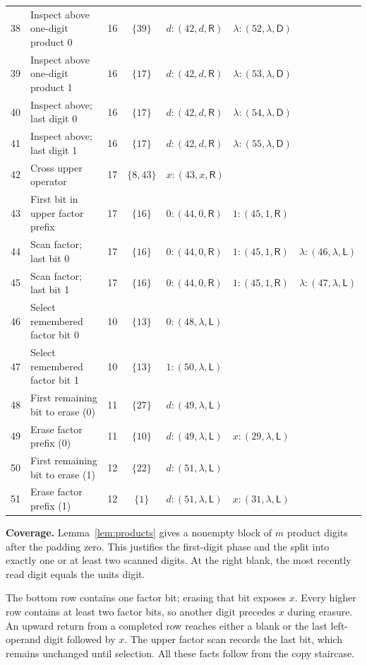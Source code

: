 \documentclass[11pt,a4paper]{article}
\newcommand{\blank}{\lambda}
\newcommand{\triple}[3]{(#1,#2,\mathsf{#3})}
\begin{document}
\begin{center}
\begin{tabularx}{\textwidth}{r p{5.5cm} c c X}
38 & Inspect above one-digit product 0 & 16 & $\{39\}$ & $d:\triple{42}{d}{R}\quad \blank:\triple{52}{\blank}{D}$ \\
39 & Inspect above one-digit product 1 & 16 & $\{17\}$ & $d:\triple{42}{d}{R}\quad \blank:\triple{53}{\blank}{D}$ \\
40 & Inspect above; last digit 0 & 16 & $\{17\}$ & $d:\triple{42}{d}{R}\quad \blank:\triple{54}{\blank}{D}$ \\
41 & Inspect above; last digit 1 & 16 & $\{17\}$ & $d:\triple{42}{d}{R}\quad \blank:\triple{55}{\blank}{D}$ \\
42 & Cross upper operator & 17 & $\{8,43\}$ & $x:\triple{43}{x}{R}$ \\
43 & First bit in upper factor prefix & 17 & $\{16\}$ & $0:\triple{44}{0}{R}\quad 1:\triple{45}{1}{R}$ \\
44 & Scan factor; last bit 0 & 17 & $\{16\}$ & $0:\triple{44}{0}{R}\quad 1:\triple{45}{1}{R}\quad \blank:\triple{46}{\blank}{L}$ \\
45 & Scan factor; last bit 1 & 17 & $\{16\}$ & $0:\triple{44}{0}{R}\quad 1:\triple{45}{1}{R}\quad \blank:\triple{47}{\blank}{L}$ \\
46 & Select remembered factor bit 0 & 10 & $\{13\}$ & $0:\triple{48}{\blank}{L}$ \\
47 & Select remembered factor bit 1 & 10 & $\{13\}$ & $1:\triple{50}{\blank}{L}$ \\
48 & First remaining bit to erase (0) & 11 & $\{27\}$ & $d:\triple{49}{\blank}{L}$ \\
49 & Erase factor prefix (0) & 11 & $\{10\}$ & $d:\triple{49}{\blank}{L}\quad x:\triple{29}{\blank}{L}$ \\
50 & First remaining bit to erase (1) & 12 & $\{22\}$ & $d:\triple{51}{\blank}{L}$ \\
51 & Erase factor prefix (1) & 12 & $\{1\}$ & $d:\triple{51}{\blank}{L}\quad x:\triple{31}{\blank}{L}$ \\
\bottomrule
\end{tabularx}
\end{center}

\textbf{Coverage.} Lemma~\ref{lem:products} gives a nonempty block of $m$
product digits after the padding zero. This justifies the first-digit phase
and the split into exactly one or at least two scanned digits. At the right blank, the most recently read digit equals the units digit.

The bottom row contains one factor bit; erasing that bit exposes $x$.
Every higher row contains at least two factor bits, so another digit
precedes $x$ during erasure. An upward return from a completed row reaches
either a blank or the last left-operand digit followed by $x$.
The upper factor scan records the last bit, which remains unchanged until selection. All these facts follow from the copy staircase.
\end{document}
